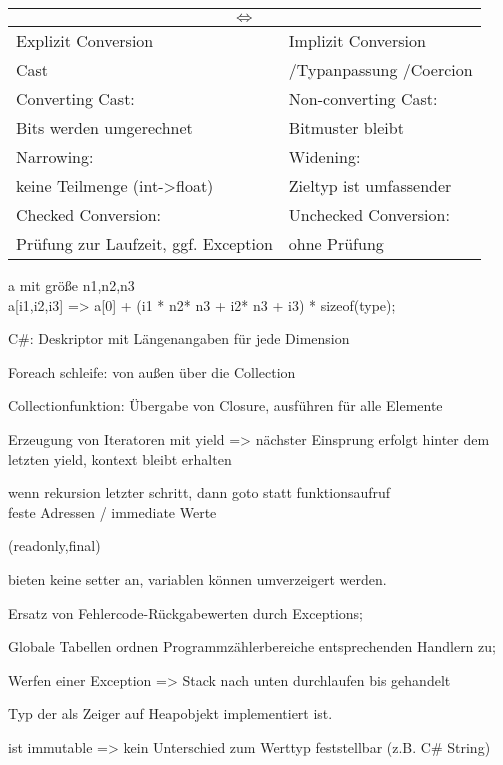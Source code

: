 \begin{tabular}{|l|l|}
\hline
\multicolumn{2}{|c|}{$\Leftrightarrow$}\\
\hline
Explizit Conversion  & Implizit Conversion \\
Cast &/Typanpassung /Coercion  \\
\hline
Converting Cast:  & Non-converting Cast: \\
Bits werden umgerechnet & Bitmuster bleibt \\
\hline
Narrowing:  & Widening:  \\
keine Teilmenge (int->float)&Zieltyp ist umfassender\\
\hline
Checked Conversion:   &Unchecked Conversion:  \\
Prüfung zur Laufzeit, ggf. Exception &ohne Prüfung\\
\hline
\end{tabular}

%


\newpage
{}
 a mit größe n1,n2,n3 \\
a[i1,i2,i3] =>  a[0] + (i1 * n2* n3 + i2* n3 + i3) * sizeof(type);

C\#: Deskriptor mit Längenangaben für jede Dimension

Foreach schleife: von außen über die Collection

 Collectionfunktion: Übergabe von Closure, ausführen für alle Elemente

Erzeugung von Iteratoren mit yield => nächster Einsprung erfolgt hinter dem letzten yield, kontext bleibt erhalten

 wenn rekursion letzter schritt, dann goto statt funktionsaufruf\\
 feste Adressen / immediate Werte

 (readonly,final)

 bieten keine setter an, variablen können umverzeigert werden.

Ersatz von Fehlercode-Rückgabewerten durch Exceptions;

Globale Tabellen ordnen Programmzählerbereiche entsprechenden Handlern zu; 

 Werfen einer Exception => Stack nach unten durchlaufen bis gehandelt


Typ der als Zeiger auf Heapobjekt implementiert ist.

 ist immutable => kein Unterschied zum Werttyp feststellbar (z.B. C\# String)

